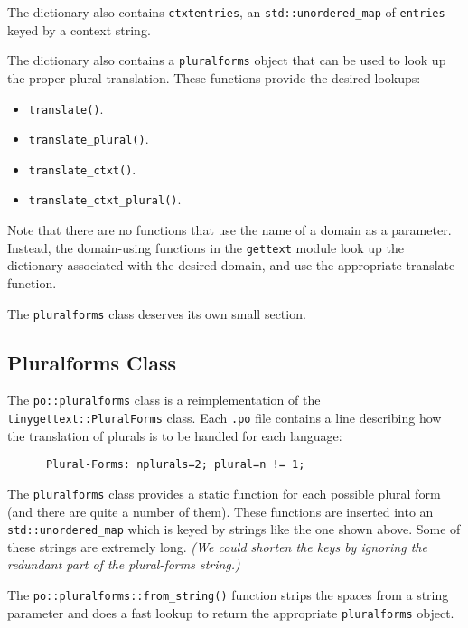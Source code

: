    The dictionary also contains \texttt{ctxtentries},
   an \texttt{std::unordered\_map} of \texttt{entries} keyed by a
   context string.

   The dictionary also contains a \texttt{pluralforms} object that can be used
   to look up the proper plural translation.
   These functions provide the desired lookups:

   \begin{itemize}
      \item \texttt{translate()}. 
      \item \texttt{translate\_plural()}. 
      \item \texttt{translate\_ctxt()}. 
      \item \texttt{translate\_ctxt\_plural()}. 
   \end{itemize}

   Note that there are no functions that use the name of a domain as
   a parameter.
   Instead, the domain-using functions in the \texttt{gettext} module
   look up the dictionary associated with the desired domain, 
   and use the appropriate translate function.

   The \texttt{pluralforms} class deserves its own small section.

\subsection{Pluralforms Class}
\label{subsec:potext_pluralforms_class}

   The \texttt{po::pluralforms} class is a reimplementation of the
   \texttt{tinygettext::PluralForms} class.
   Each \texttt{.po} file contains a line describing how the translation of
   plurals is to be handled for each language:

   \begin{verbatim}
      Plural-Forms: nplurals=2; plural=n != 1;
   \end{verbatim}
   
   The \texttt{pluralforms} class provides a static function for each
   possible plural form (and there are quite a number of them).
   These functions are inserted into an \texttt{std::unordered\_map}
   which is keyed by strings like the one shown above.
   Some of these strings are extremely long.
   \textsl{(We could shorten the keys by ignoring the redundant part
   of the plural-forms string.)}

   The \texttt{po::pluralforms::from\_string()} function strips the
   spaces from a string parameter and does a fast lookup to return the
   appropriate \texttt{pluralforms} object.

